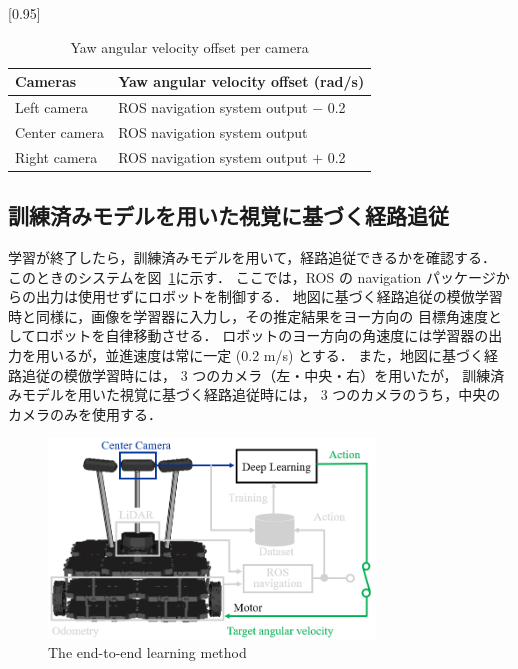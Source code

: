\documentclass{jarticle}
\renewcommand{\figurename}{図~}
\newcommand{\figref}[1]{\figurename\ref{#1}}
\begin{document}
\vspace*{-2zh}

\begin{table}[h!]
  \centering
  \caption{Yaw angular velocity offset per camera}
  \label{table:1}
    \scalebox{0.95}[0.95]{
    \begin{tabular}{|l|l|}
      \hline\hline
      Cameras & Yaw angular velocity offset (rad/s)\\
      \hline\hline
      Left camera & ROS navigation system output $-$ 0.2\\
      \hline
      Center camera & ROS navigation system output\\
      \hline
      Right camera & ROS navigation system output $+$ 0.2\\
      \hline
    \end{tabular} }
\end {table}




\subsection{訓練済みモデルを用いた視覚に基づく経路追従}
学習が終了したら，訓練済みモデルを用いて，経路追従できるかを確認する．
このときのシステムを\figref{fig:4}に示す．
ここでは，ROS の navigation パッケージからの出力は使用せずにロボットを制御する．
地図に基づく経路追従の模倣学習時と同様に，画像を学習器に入力し，その推定結果をヨー方向の
目標角速度としてロボットを自律移動させる．
ロボットのヨー方向の角速度には学習器の出力を用いるが，並進速度は常に一定 (0.2 m/s) とする．
また，地図に基づく経路追従の模倣学習時には， 3 つのカメラ（左・中央・右）を用いたが，
訓練済みモデルを用いた視覚に基づく経路追従時には， 3 つのカメラのうち，中央のカメラのみを使用する．

\begin{figure}[h!]
  \centering
   \includegraphics[height=53mm]{./png/afterlearn.png}
   \caption{The end-to-end learning method}
   \label{fig:4}
\end{figure}
\end{document}
